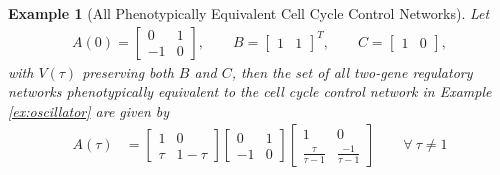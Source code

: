 \documentclass[9 pt]{article}
\newcommand{\1}{\mathbbm{1}}
\newtheorem{example}{Example}
\begin{document}
  \begin{example}[All Phenotypically Equivalent Cell Cycle Control Networks]

    Let
    \begin{align*}
      A(0) = \begin{bmatrix} 0 & 1 \\ -1 & 0 \end{bmatrix}, \qquad B = \begin{bmatrix} 1 & 1 \end{bmatrix}^{T}, \qquad C = \begin{bmatrix} 1 & 0 \end{bmatrix},
    \end{align*}
    with $V(\tau)$ preserving both $B$ and $C$, then
    the set of all two-gene regulatory networks phenotypically equivalent to the cell cycle control network in Example \ref{ex:oscillator} are given by
    \begin{align*}
      A(\tau) &= \begin{bmatrix} 1 & 0 \\ \tau & 1-\tau \end{bmatrix} \begin{bmatrix} 0 & 1 \\ -1 & 0 \end{bmatrix} \begin{bmatrix} 1 & 0 \\ \frac{\tau}{\tau-1} & \frac{-1}{\tau-1} \end{bmatrix}  \qquad \forall \ \tau \neq 1 %
    \end{align*}
    \begin{figure}[H]
    \centering
{}
\end{figure}
\end{example}
\end{document}
